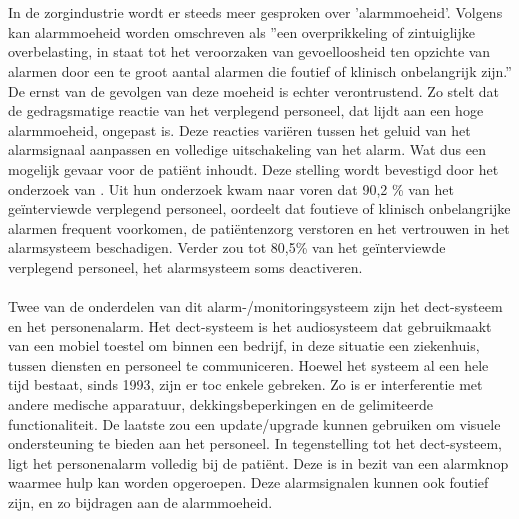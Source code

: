 
\chapter{}%
\label{ch:inleiding}


\section{}%
\label{sec:probleemstelling}

In de zorgindustrie wordt er steeds meer gesproken over 'alarmmoeheid'. Volgens \textcite{Ferrara2023} kan alarmmoeheid worden omschreven als ''een overprikkeling of zintuiglijke overbelasting, in staat tot het veroorzaken van gevoelloosheid ten opzichte van alarmen door een te groot aantal alarmen die foutief of klinisch onbelangrijk zijn.'' De ernst van de gevolgen van deze moeheid is echter verontrustend. Zo stelt \textcite{Ferrara2023} dat de gedragsmatige reactie van het verplegend personeel, dat lijdt aan een hoge alarmmoeheid, ongepast is. Deze reacties variëren tussen het geluid van het alarmsignaal aanpassen en volledige uitschakeling van het alarm. Wat dus een mogelijk gevaar voor de patiënt inhoudt. Deze stelling wordt bevestigd door het onderzoek van \textcite{Casey2018}. Uit hun onderzoek kwam naar voren dat 90,2 \% van het geïnterviewde verplegend personeel, oordeelt dat foutieve of klinisch onbelangrijke alarmen frequent voorkomen, de patiëntenzorg verstoren en het vertrouwen in het alarmsysteem beschadigen. Verder zou tot 80,5\% van het geïnterviewde verplegend personeel, het alarmsysteem soms deactiveren.
\\\\
Twee van de onderdelen van dit alarm-/monitoringsysteem zijn het \gls{dect}-systeem en het personenalarm. Het \gls{dect}-systeem is het audiosysteem dat gebruikmaakt van een mobiel toestel om binnen een bedrijf, in deze situatie een ziekenhuis, tussen diensten en personeel te communiceren. Hoewel het systeem al een hele tijd bestaat, sinds 1993, zijn er toc enkele gebreken. Zo is er interferentie met andere medische apparatuur, dekkingsbeperkingen en de gelimiteerde functionaliteit. De laatste zou een update/upgrade kunnen gebruiken om visuele ondersteuning te bieden aan het personeel.
In tegenstelling tot het \gls{dect}-systeem, ligt het personenalarm volledig bij de patiënt. Deze is in bezit van een alarmknop waarmee hulp kan worden opgeroepen. Deze alarmsignalen kunnen ook foutief zijn, en zo bijdragen aan de alarmmoeheid.\\

